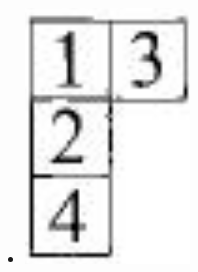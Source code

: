 \documentclass[12pt,a4paper]{article}
\newcommand{\h}[2]{\color{#1} #2 \color{black} }
\newcommand{\equalInM}[1]{\h{blue}{#1}} %
\newcommand{\equalInTableau}[1]{\h{magenta}{#1}} %
\newcommand{\equalAntiSym}[1]{\h{brown}{#1}} %
\begin{document}
\begin{itemize}
\begin{itemize}
\begin{itemize}
\item $\hat{S} \left(
123 + 312 + 231 - 213 - 132 - 321
 \right) 4$ \\ 
 $= \equalInM{1234}  \equalInTableau{+ 4231} 
 \equalAntiSym{+ 3124 }+ 3421 
 \equalAntiSym{+ 2314 }+ 2341$\\
 $\equalInTableau{-2134} - 2431 
 \equalAntiSym{- 1324} \equalAntiSym{ - 4321}
  \equalInTableau{- 3214} - 3241$ \\
  $= \begin{vmatrix} 123\end{vmatrix} 4 $
  \\ bzw. $abcd + dbca + bcad + dcab + cabd + dabc$\\$
-bacd - dacb - acbd - dcba - cbad - dbac = \begin{vmatrix}
abc\end{vmatrix}d$
\item Integrale mit Vorfaktoren $\frac{1}{\sqrt{12} }$ werden zu: \\
$ + D + \frac{1}{3} \cdot (ad|da) - 1 \cdot (ab|ba) - 1 \cdot (bc|cb) - 1 \cdot (ac|ca) + \frac{1}{3} \cdot (bd|db) + \frac{1}{3} \cdot (cd|dc) $ 
\end{itemize}
\item \includegraphics[scale=0.2]{build/young-21hoch2-13.png}
\end{itemize}
\end{itemize}
\end{document}
